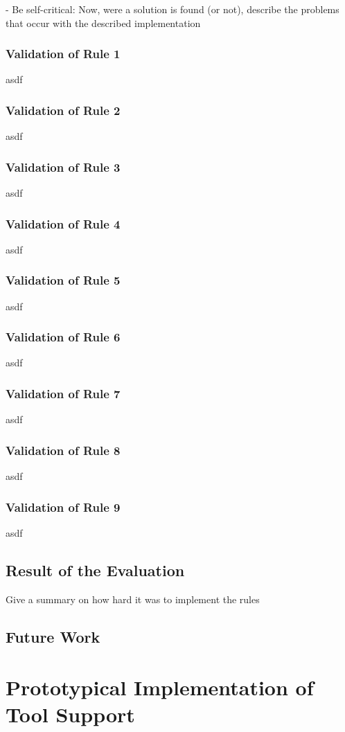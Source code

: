  - Be self-critical: Now, were a solution is found (or not), describe the problems that occur with the described implementation

\subsection{Validation of Rule 1}
asdf
\subsection{Validation of Rule 2}
asdf
\subsection{Validation of Rule 3}
asdf
\subsection{Validation of Rule 4}
asdf
\subsection{Validation of Rule 5}
asdf
\subsection{Validation of Rule 6}
asdf
\subsection{Validation of Rule 7}
asdf
\subsection{Validation of Rule 8}
asdf
\subsection{Validation of Rule 9}
asdf
\section{Result of the Evaluation}
Give a summary on how hard it was to implement the rules
\section{Future Work}

\chapter{Prototypical Implementation of Tool Support}
